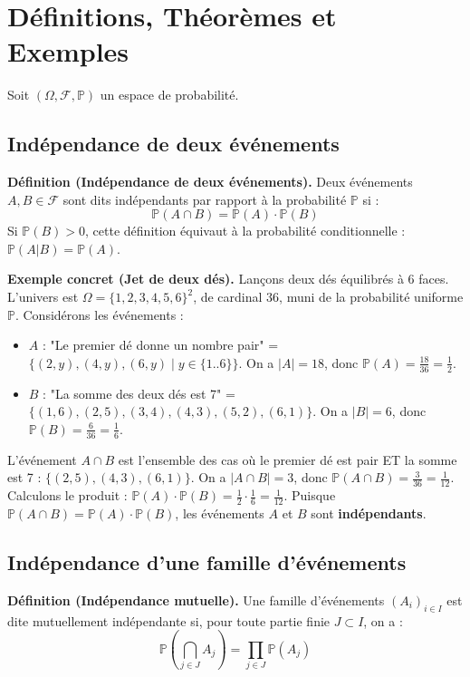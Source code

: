 \documentclass[11pt,a4paper]{article}
\begin{document}
\section{Définitions, Théorèmes et Exemples}

Soit $(\Omega, \mathcal{F}, \mathbb{P})$ un espace de probabilité.

\subsection{Indépendance de deux événements}

\textbf{Définition (Indépendance de deux événements).} Deux événements $A, B \in \mathcal{F}$ sont dits indépendants par rapport à la probabilité $\mathbb{P}$ si :
$$ \mathbb{P}(A \cap B) = \mathbb{P}(A) \cdot \mathbb{P}(B) $$
Si $\mathbb{P}(B) > 0$, cette définition équivaut à la probabilité conditionnelle : $\mathbb{P}(A|B) = \mathbb{P}(A)$.

\textbf{Exemple concret (Jet de deux dés).}
Lançons deux dés équilibrés à 6 faces. L'univers est $\Omega = \{1, 2, 3, 4, 5, 6\}^2$, de cardinal $36$, muni de la probabilité uniforme $\mathbb{P}$.
Considérons les événements :
\begin{itemize}
\item $A$ : "Le premier dé donne un nombre pair" = $\{(2,y), (4,y), (6,y) \mid y \in \{1..6\}\}$. On a $|A| = 18$, donc $\mathbb{P}(A) = \frac{18}{36} = \frac{1}{2}$.
\item $B$ : "La somme des deux dés est 7" = $\{(1,6), (2,5), (3,4), (4,3), (5,2), (6,1)\}$. On a $|B| = 6$, donc $\mathbb{P}(B) = \frac{6}{36} = \frac{1}{6}$.
\end{itemize}L'événement $A \cap B$ est l'ensemble des cas où le premier dé est pair ET la somme est 7 : $\{(2,5), (4,3), (6,1)\}$.
On a $|A \cap B| = 3$, donc $\mathbb{P}(A \cap B) = \frac{3}{36} = \frac{1}{12}$.
Calculons le produit : $\mathbb{P}(A) \cdot \mathbb{P}(B) = \frac{1}{2} \cdot \frac{1}{6} = \frac{1}{12}$.
Puisque $\mathbb{P}(A \cap B) = \mathbb{P}(A) \cdot \mathbb{P}(B)$, les événements $A$ et $B$ sont \textbf{indépendants}.

\subsection{Indépendance d'une famille d'événements}

\textbf{Définition (Indépendance mutuelle).} Une famille d'événements $(A_i)_{i \in I}$ est dite mutuellement indépendante si, pour toute partie finie $J \subset I$, on a :
$$ \mathbb{P}\left( \bigcap_{j \in J} A_j \right) = \prod_{j \in J} \mathbb{P}(A_j) $$
\end{document}
